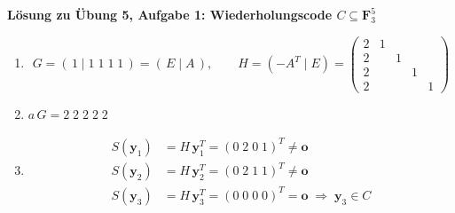 \textbf{Lösung zu Übung 5, Aufgabe 1: Wiederholungscode $C \subseteq \mathbf{F}_3^5$}

\begin{loesung}
\begin{enumerate}[label=\alph*)]
\item
\[
G = (\,1 \mid 1\;1\;1\;1\,) = (\,E \mid A\,), \qquad
H = (-A^T \mid E) =
\begin{pmatrix}
2 & 1 & & & \\
2 & & 1 & & \\
2 & & & 1 & \\
2 & & & & 1
\end{pmatrix}
\]
\item $a\,G = 2\;2\;2\;2\;2$
\item
\begin{align*}
S(\mathbf{y}_1) &= H\,\mathbf{y}_1^T = (0\;2\;0\;1)^T \ne \mathbf{o}\\
S(\mathbf{y}_2) &= H\,\mathbf{y}_2^T = (0\;2\;1\;1)^T \ne \mathbf{o}\\
S(\mathbf{y}_3) &= H\,\mathbf{y}_3^T = (0\;0\;0\;0)^T = \mathbf{o} \;\Rightarrow\; \mathbf{y}_3 \in C
\end{align*}
\end{enumerate}
\end{loesung}
